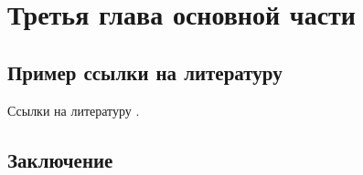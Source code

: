 \chapter{Третья глава основной части} \label{chap:3}

\section{Пример ссылки на литературу}

Ссылки на литературу \cite{NLPub,Ustalov:14}.

\section{Заключение}
